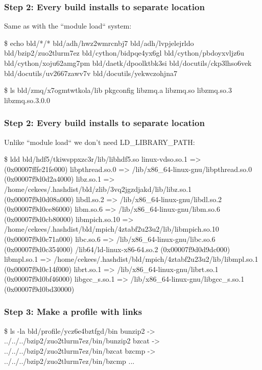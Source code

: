 \documentclass[sans,mathserif]{beamer}
\begin{document}
\begin{frame}[fragile]
  \frametitle{Step 2: Every build installs to separate location}
Same as with the ``module load`` system:

\begin{semiverbatim}
\$ echo bld/*/* bld/adh/hwz2wmrcnbj7 bld/adh/lvpjelejrldo
bld/bzip2/zuo2tlurm7ez bld/cython/bidpqe4yx6gl bld/cython/pbdoyxvljz6u
bld/cython/xoju62amg7pm bld/daetk/dpoolktbk3si
bld/docutils/ckp3lhso6vek bld/docutils/uv2667zawv7v
bld/docutils/yekwczohjna7

\$ ls bld/zmq/x7ogmtwtkola/lib
pkgconfig  libzmq.a  libzmq.so  libzmq.so.3  libzmq.so.3.0.0

\end{semiverbatim}
\end{frame}

\begin{frame}[fragile]
  \frametitle{Step 2: Every build installs to separate location}
Unlike ``module load`` we don't need LD\_LIBRARY\_PATH:
\begin{semiverbatim}
\$ ldd bld/hdf5/tkiwsppxzc3r/lib/libhdf5.so
	linux-vdso.so.1 =>  (0x00007fffe21fe000)
	libpthread.so.0 => /lib/x86_64-linux-gnu/libpthread.so.0 (0x00007f9d0d2a4000)
	libz.so.1 => /home/cekees/.hashdist/bld/zlib/3vq2jgzdjakd/lib/libz.so.1 (0x00007f9d0d08a000)
	libdl.so.2 => /lib/x86_64-linux-gnu/libdl.so.2 (0x00007f9d0ce86000)
	libm.so.6 => /lib/x86_64-linux-gnu/libm.so.6 (0x00007f9d0cb80000)
	libmpich.so.10 => /home/cekees/.hashdist/bld/mpich/4ztabf2u23u2/lib/libmpich.so.10 (0x00007f9d0c71a000)
	libc.so.6 => /lib/x86_64-linux-gnu/libc.so.6 (0x00007f9d0c354000)
	/lib64/ld-linux-x86-64.so.2 (0x00007f9d0d9dc000)
	libmpl.so.1 => /home/cekees/.hashdist/bld/mpich/4ztabf2u23u2/lib/libmpl.so.1 (0x00007f9d0c14f000)
	librt.so.1 => /lib/x86_64-linux-gnu/librt.so.1 (0x00007f9d0bf46000)
	libgcc_s.so.1 => /lib/x86_64-linux-gnu/libgcc_s.so.1 (0x00007f9d0bd30000)
\end{semiverbatim}
\end{frame}


\begin{frame}[fragile]
\frametitle{Step 3: Make a profile with links}
\begin{semiverbatim}
\$ ls -la bld/profile/ycz6e4bztfgd/bin
bunzip2 -> ../../../bzip2/zuo2tlurm7ez/bin/bunzip2
bzcat -> ../../../bzip2/zuo2tlurm7ez/bin/bzcat
bzcmp -> ../../../bzip2/zuo2tlurm7ez/bin/bzcmp
...
\end{semiverbatim}
\end{frame}
\end{document}
